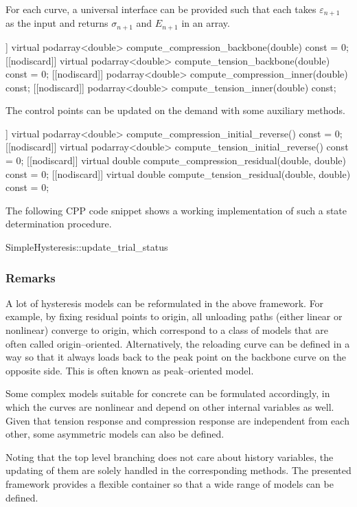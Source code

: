 For each curve, a universal interface can be provided such that each takes $\varepsilon_{n+1}$ as the input and returns $\sigma_{n+1}$ and $E_{n+1}$ in an array.
\begin{cppcode}
	[[nodiscard]] virtual podarray<double> compute_compression_backbone(double) const = 0;
	[[nodiscard]] virtual podarray<double> compute_tension_backbone(double) const = 0;
	[[nodiscard]] podarray<double> compute_compression_inner(double) const;
	[[nodiscard]] podarray<double> compute_tension_inner(double) const;
\end{cppcode}
The control points can be updated on the demand with some auxiliary methods.
\begin{cppcode}
	[[nodiscard]] virtual podarray<double> compute_compression_initial_reverse() const = 0;
	[[nodiscard]] virtual podarray<double> compute_tension_initial_reverse() const = 0;
	[[nodiscard]] virtual double compute_compression_residual(double, double) const = 0;
	[[nodiscard]] virtual double compute_tension_residual(double, double) const = 0;
\end{cppcode}

The following CPP code snippet shows a working implementation of such a state determination procedure.
\begin{cppcode}
SimpleHysteresis::update_trial_status
\end{cppcode}
\subsubsection{Remarks}
A lot of hysteresis models can be reformulated in the above framework. For example, by fixing residual points to origin, all unloading paths (either linear or nonlinear) converge to origin, which correspond to a class of models that are often called origin--oriented. Alternatively, the reloading curve can be defined in a way so that it always loads back to the peak point on the backbone curve on the opposite side. This is often known as peak--oriented model.

Some complex models suitable for concrete can be formulated accordingly, in which the curves are nonlinear and depend on other internal variables as well. Given that tension response and compression response are independent from each other, some asymmetric models can also be defined.

Noting that the top level branching does not care about history variables, the updating of them are solely handled in the corresponding methods. The presented framework provides a flexible container so that a wide range of models can be defined.

